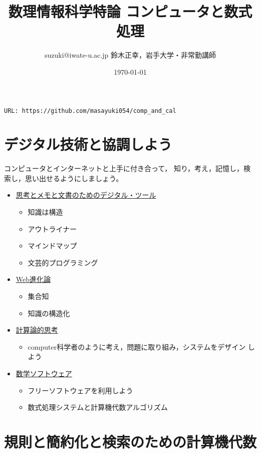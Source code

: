 \documentclass[dvipdfmx,11pat]{jarticle}
\author{suzuki@iwate-u.ac.jp 鈴木正幸，岩手大学・非常勤講師}
\date{\today}
\title{数理情報科学特論 コンピュータと数式処理}
\begin{document}
\maketitle
\tableofcontents

\begin{center}
\large{\tt URL: https://github.com/masayuki054/comp\_and\_cal}
\end{center}

\section{デジタル技術と協調しよう}
\label{sec:org067cfa0}

コンピュータとインターネットと上手に付き合って，
知り，考え，記憶し，検索し，思い出せるようにしましょう。

\begin{itemize}
\item \href{./org/digital\_tools.org}{思考とメモと文書のためのデジタル・ツール}
\begin{itemize}
\item 知識は構造
\item アウトライナー
\item マインドマップ
\item 文芸的プログラミング
\end{itemize}

\item \href{./org/web.org}{Web進化論}
\begin{itemize}
\item 集合知
\item 知識の構造化
\end{itemize}

\item \href{./org/comp\_thinking.org}{計算論的思考}
\begin{itemize}
\item computer科学者のように考え，問題に取り組み，システムをデザイン
しよう
\end{itemize}

\item \href{./org/math-soft.org}{数学ソフトウェア}
\begin{itemize}
\item フリーソフトウェアを利用しよう
\item 数式処理システムと計算機代数アルゴリズム
\end{itemize}
\end{itemize}

\section{規則と簡約化と検索のための計算機代数}
\label{sec:org83d7f97}
\end{document}
